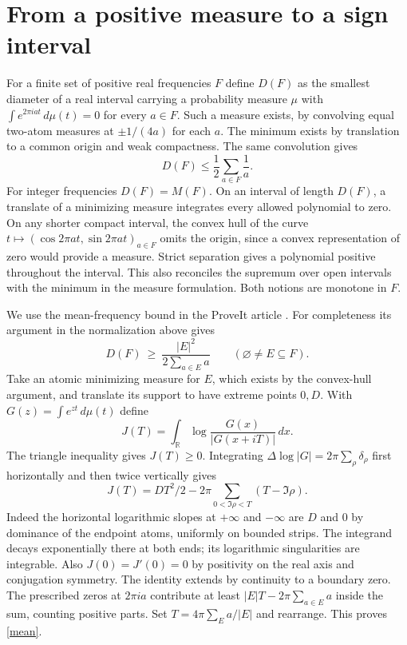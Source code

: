\documentclass[11pt]{article}
\newcommand{\R}{\mathbb R}
\begin{document}
\section{From a positive measure to a sign interval}
For a finite set of positive real frequencies $F$ define $D(F)$ as the smallest diameter of a real interval carrying a probability measure $\mu$ with $\int e^{2\pi i a t}\,d\mu(t)=0$ for every $a\in F$. Such a measure exists, by convolving equal two-atom measures at $\pm1/(4a)$ for each $a$. The minimum exists by translation to a common origin and weak compactness. The same convolution gives
\begin{equation}\label{sep}
                D(F)\le\frac12\sum_{a\in F}\frac1a .
\end{equation}
For integer frequencies $D(F)=M(F)$. On an interval of length $D(F)$, a translate of a minimizing measure integrates every allowed polynomial to zero. On any shorter compact interval, the convex hull of the curve $t\mapsto(\cos 2\pi a t,\sin 2\pi a t)_{a\in F}$ omits the origin, since a convex representation of zero would provide a measure. Strict separation gives a polynomial positive throughout the interval. This also reconciles the supremum over open intervals with the minimum in the measure formulation. Both notions are monotone in $F$.

We use the mean-frequency bound in the ProveIt article \cite{repo}. For completeness its argument in the normalization above gives
\begin{equation}\label{mean}
 D(F)\ \ge\ \frac{|E|^2}{2\sum_{a\in E} a}
 \qquad(\varnothing\ne E\subseteq F).
\end{equation}
Take an atomic minimizing measure for $E$, which exists by the convex-hull argument, and translate its support to have extreme points $0,D$. With $G(z)=\int e^{zt}\,d\mu(t)$ define
\[
 J(T)=\int_\R\log\frac{G(x)}{|G(x+iT)|}\,dx.
\]
The triangle inequality gives $J(T)\ge0$. Integrating $\Delta\log|G|=2\pi\sum_\rho\delta_\rho$ first horizontally and then twice vertically gives
\[
 J(T)=DT^2/2-2\pi\sum_{0<\Im\rho<T}(T-\Im\rho).
\]
Indeed the horizontal logarithmic slopes at $+\infty$ and $-\infty$ are $D$ and $0$ by dominance of the endpoint atoms, uniformly on bounded strips. The integrand decays exponentially there at both ends; its logarithmic singularities are integrable. Also $J(0)=J'(0)=0$ by positivity on the real axis and conjugation symmetry. The identity extends by continuity to a boundary zero. The prescribed zeros at $2\pi i a$ contribute at least $|E|T-2\pi\sum_{a\in E}a$ inside the sum, counting positive parts. Set $T=4\pi\sum_Ea/|E|$ and rearrange. This proves \eqref{mean}.
\end{document}
